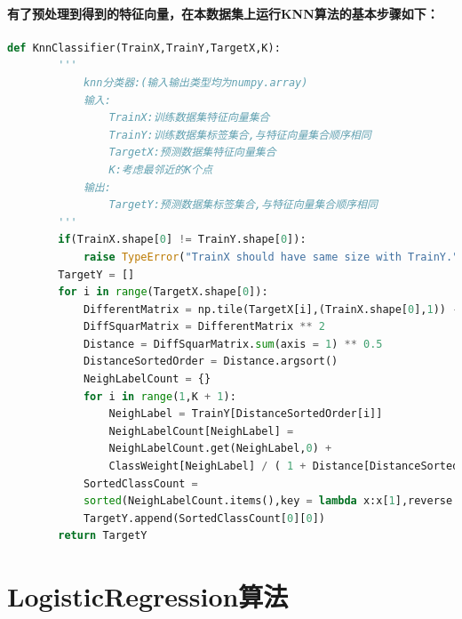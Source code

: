 \documentclass{ctexart}
\begin{document}
    \paragraph{
        有了预处理到得到的特征向量，在本数据集上运行KNN算法的基本步骤如下：\\[20pt]  
    }
    \begin{lstlisting}[language=python, basicstyle=\small,keywordstyle=\color{blue!100},commentstyle=\color{red!100!},frame=shadowbox, rulesepcolor=\color{red!20!green!20!blue!20}]
        def KnnClassifier(TrainX,TrainY,TargetX,K):
        '''
            knn分类器:(输入输出类型均为numpy.array)
            输入:
                TrainX:训练数据集特征向量集合
                TrainY:训练数据集标签集合,与特征向量集合顺序相同
                TargetX:预测数据集特征向量集合
                K:考虑最邻近的K个点
            输出:
                TargetY:预测数据集标签集合,与特征向量集合顺序相同
        '''
        if(TrainX.shape[0] != TrainY.shape[0]):
            raise TypeError("TrainX should have same size with TrainY.")
        TargetY = []
        for i in range(TargetX.shape[0]):
            DifferentMatrix = np.tile(TargetX[i],(TrainX.shape[0],1)) - TrainX
            DiffSquarMatrix = DifferentMatrix ** 2
            Distance = DiffSquarMatrix.sum(axis = 1) ** 0.5
            DistanceSortedOrder = Distance.argsort()
            NeighLabelCount = {}
            for i in range(1,K + 1):
                NeighLabel = TrainY[DistanceSortedOrder[i]]
                NeighLabelCount[NeighLabel] = 
                NeighLabelCount.get(NeighLabel,0) + 
                ClassWeight[NeighLabel] / ( 1 + Distance[DistanceSortedOrder[i]] )
            SortedClassCount = 
            sorted(NeighLabelCount.items(),key = lambda x:x[1],reverse = True)
            TargetY.append(SortedClassCount[0][0])
        return TargetY
    \end{lstlisting}
    \section{LogisticRegression算法}
\end{document}
